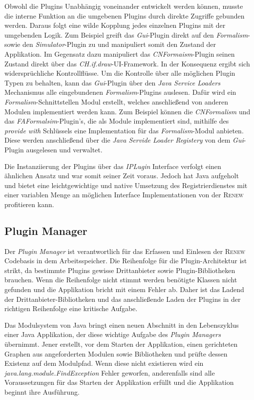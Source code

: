 	Obwohl die Plugins Unabhängig voneinander entwickelt werden können, musste die interne Funktion an die umgebenen Plugins durch direkte Zugriffe gebunden werden. Daraus folgt eine wilde Kopplung jedes einzelnen Plugins mit der umgebenden Logik. Zum Beispiel greift das \textit{Gui}-Plugin direkt auf den \textit{Formalism}- sowie den \textit{Simulator}-Plugin zu und manipuliert somit den Zustand der Applikation. Im Gegensatz dazu manipuliert das \textit{CNFormaism}-Plugin seinen Zustand direkt über das \textit{CH.if.draw}-UI-Framework. In der Konsequenz ergibt sich widersprüchliche Kontrollflüsse.\newline  
	Um die Kontrolle über alle möglichen Plugin Typen zu behalten, kann das \textit{Gui}-Plugin über den \textit{Java Service Loaders} Mechanismus alle eingebundenen \textit{Formalism}-Plugins auslesen. Dafür wird ein \textit{Formalism}-Schnittstellen Modul erstellt, welches anschließend von anderen Modulen implementiert werden kann. Zum Beispiel können die \textit{CNFormalism} und das \textit{FAFormalsim}-Plugin's, die als Module implementiert sind, mithilfe des \textit{provide with} Schlüssels eine Implementation für das \textit{Formalism}-Modul anbieten. Diese werden anschließend über die \textit{Java Servide Loader Registery} von dem \textit{Gui}-Plugin ausgelesen und verwaltet. \bigbreak

	Die Instanziierung der Plugins über das \textit{IPLugin} Interface verfolgt einen ähnlichen Ansatz und war somit seiner Zeit voraus. Jedoch hat Java aufgeholt und bietet eine leichtgewichtige und native Umsetzung des Registrierdienstes mit einer variablen Menge an möglichen Interface Implementationen von der \textsc{Renew} profitieren kann.   

\subsection{Plugin Manager}
	Der \textit{Plugin Manager} ist verantwortlich für das Erfassen und Einlesen der \textsc{Renew} Codebasis in dem Arbeitsspeicher. Die Reihenfolge für die Plugin-Architektur ist strikt, da bestimmte Plugins gewisse Drittanbieter sowie Plugin-Bibliotheken brauchen. Wenn die Reihenfolge nicht stimmt werden benötigte Klassen nicht gefunden und die Applikation bricht mit einem Fehler ab. Daher ist das Ladend der Drittanbieter-Bibliotheken und das anschließende Laden der Plugins in der richtigen Reihenfolge eine kritische Aufgabe. \bigbreak

	Das Modulsystem von Java bringt einen neuen Abschnitt in den Lebenszyklus einer Java Applikation, der diese wichtige Aufgabe des \textit{Plugin Managers} übernimmt. Jener erstellt, vor dem Starten der Applikation, einen gerichteten Graphen aus angeforderten Modulen sowie Bibliotheken und prüfte dessen Existenz auf dem Modulpfad. Wenn diese nicht existieren wird ein \textit{java.lang.module.FindException} Fehler geworfen, anderenfalls sind alle Voraussetzungen für das Starten der Applikation erfüllt und die Applikation beginnt ihre Ausführung. \bigbreak

